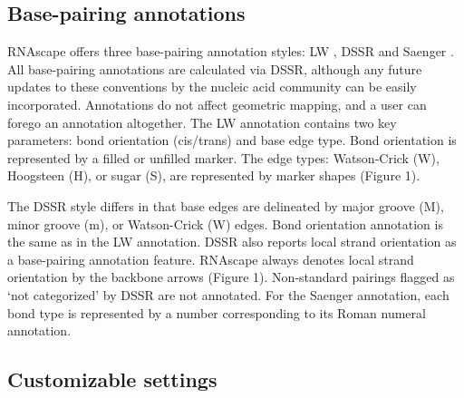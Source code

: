 \subsection{Base-pairing annotations}

RNAscape offers three base-pairing annotation styles: LW \citep{Yang2003, Leontis2001}, DSSR \citep{lu2015dssr} and Saenger \citep{Saenger1984}. All base-pairing annotations are calculated via DSSR, although any future updates to these conventions by the nucleic acid community can be easily incorporated. Annotations do not affect geometric mapping, and a user can forego an annotation altogether. The LW annotation contains two key parameters: bond orientation (cis/trans) and base edge type. Bond orientation is represented by a filled or unfilled marker. The edge types: Watson-Crick (W), Hoogsteen (H), or sugar (S), are represented by marker shapes (Figure 1).

The DSSR style differs in that base edges are delineated by major groove (M), minor groove (m), or Watson-Crick (W) edges. Bond orientation annotation is the same as in the LW \citep{Yang2003, Leontis2001} annotation. DSSR also reports local strand orientation as a base-pairing annotation feature. RNAscape always denotes local strand orientation by the backbone arrows (Figure 1). Non-standard pairings flagged as ‘not categorized’ by DSSR are not annotated. For the Saenger \citep{Saenger1984} annotation, each bond type is represented by a number corresponding to its Roman numeral annotation.

\subsection{Customizable settings}


